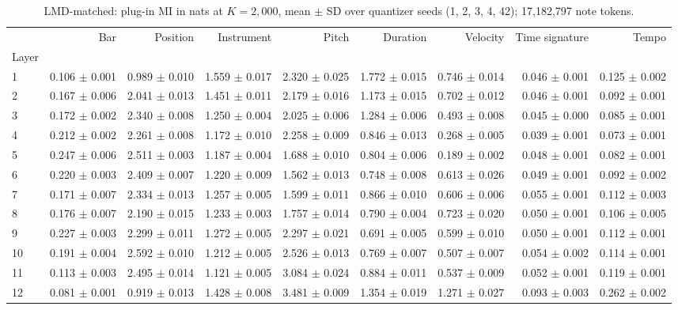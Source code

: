 \documentclass[10pt]{article}
\begin{document}
\begin{table}[h]\centering\scriptsize\setlength{\tabcolsep}{3.5pt}
\caption{LMD-matched: plug-in MI in nats at $K=2,000$, mean $\pm$ SD over quantizer seeds (1, 2, 3, 4, 42); 17,182,797 note tokens.}\label{tab:lmd2000}
\begin{tabular}{lrrrrrrrr}
\toprule
 & Bar & Position & Instrument & Pitch & Duration & Velocity & Time signature & Tempo \\
Layer &  &  &  &  &  &  &  &  \\
\midrule
1 & 0.106 $\pm$ 0.001 & 0.989 $\pm$ 0.010 & 1.559 $\pm$ 0.017 & 2.320 $\pm$ 0.025 & 1.772 $\pm$ 0.015 & 0.746 $\pm$ 0.014 & 0.046 $\pm$ 0.001 & 0.125 $\pm$ 0.002 \\
2 & 0.167 $\pm$ 0.006 & 2.041 $\pm$ 0.013 & 1.451 $\pm$ 0.011 & 2.179 $\pm$ 0.016 & 1.173 $\pm$ 0.015 & 0.702 $\pm$ 0.012 & 0.046 $\pm$ 0.001 & 0.092 $\pm$ 0.001 \\
3 & 0.172 $\pm$ 0.002 & 2.340 $\pm$ 0.008 & 1.250 $\pm$ 0.004 & 2.025 $\pm$ 0.006 & 1.284 $\pm$ 0.006 & 0.493 $\pm$ 0.008 & 0.045 $\pm$ 0.000 & 0.085 $\pm$ 0.001 \\
4 & 0.212 $\pm$ 0.002 & 2.261 $\pm$ 0.008 & 1.172 $\pm$ 0.010 & 2.258 $\pm$ 0.009 & 0.846 $\pm$ 0.013 & 0.268 $\pm$ 0.005 & 0.039 $\pm$ 0.001 & 0.073 $\pm$ 0.001 \\
5 & 0.247 $\pm$ 0.006 & 2.511 $\pm$ 0.003 & 1.187 $\pm$ 0.004 & 1.688 $\pm$ 0.010 & 0.804 $\pm$ 0.006 & 0.189 $\pm$ 0.002 & 0.048 $\pm$ 0.001 & 0.082 $\pm$ 0.001 \\
6 & 0.220 $\pm$ 0.003 & 2.409 $\pm$ 0.007 & 1.220 $\pm$ 0.009 & 1.562 $\pm$ 0.013 & 0.748 $\pm$ 0.008 & 0.613 $\pm$ 0.026 & 0.049 $\pm$ 0.001 & 0.092 $\pm$ 0.002 \\
7 & 0.171 $\pm$ 0.007 & 2.334 $\pm$ 0.013 & 1.257 $\pm$ 0.005 & 1.599 $\pm$ 0.011 & 0.866 $\pm$ 0.010 & 0.606 $\pm$ 0.006 & 0.055 $\pm$ 0.001 & 0.112 $\pm$ 0.003 \\
8 & 0.176 $\pm$ 0.007 & 2.190 $\pm$ 0.015 & 1.233 $\pm$ 0.003 & 1.757 $\pm$ 0.014 & 0.790 $\pm$ 0.004 & 0.723 $\pm$ 0.020 & 0.050 $\pm$ 0.001 & 0.106 $\pm$ 0.005 \\
9 & 0.227 $\pm$ 0.003 & 2.299 $\pm$ 0.011 & 1.272 $\pm$ 0.005 & 2.297 $\pm$ 0.021 & 0.691 $\pm$ 0.005 & 0.599 $\pm$ 0.010 & 0.050 $\pm$ 0.001 & 0.112 $\pm$ 0.001 \\
10 & 0.191 $\pm$ 0.004 & 2.592 $\pm$ 0.010 & 1.212 $\pm$ 0.005 & 2.526 $\pm$ 0.013 & 0.769 $\pm$ 0.007 & 0.507 $\pm$ 0.007 & 0.054 $\pm$ 0.002 & 0.114 $\pm$ 0.001 \\
11 & 0.113 $\pm$ 0.003 & 2.495 $\pm$ 0.014 & 1.121 $\pm$ 0.005 & 3.084 $\pm$ 0.024 & 0.884 $\pm$ 0.011 & 0.537 $\pm$ 0.009 & 0.052 $\pm$ 0.001 & 0.119 $\pm$ 0.001 \\
12 & 0.081 $\pm$ 0.001 & 0.919 $\pm$ 0.013 & 1.428 $\pm$ 0.008 & 3.481 $\pm$ 0.009 & 1.354 $\pm$ 0.019 & 1.271 $\pm$ 0.027 & 0.093 $\pm$ 0.003 & 0.262 $\pm$ 0.002 \\
\bottomrule
\end{tabular}
\end{table}
\end{document}
